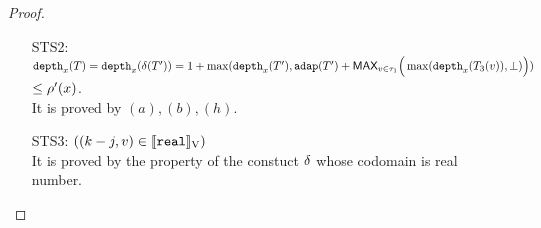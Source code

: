 \begin{proof}
\begin{mainitem}
\begin{enumerate}
\item [STS2:] $ \mathtt{depth}_{x}(T) = \mathtt{depth}_{x}(\delta (T')) =  1 +  \max(\mathtt{depth}_{x}(T'),
        \mathtt{adap}(T') + \textsf{MAX}_{v \in \tau_1} \Big(
          \max(\mathtt{depth}_{x}(T_3(v)), \bot )   \Big ) )$ \\
 $\leq      \rho'(x) $.\\
       It is proved by $(a),(b),(h)$.\\
\item[STS3:] $ ((k - j, v) \in [\![ \mathtt{real} ]\!]_{\text{V}})$\\
    It is proved by the property of the constuct $\delta$ whose
    codomain is real number. \\
        
\end{enumerate}

\end{mainitem}
\end{proof}